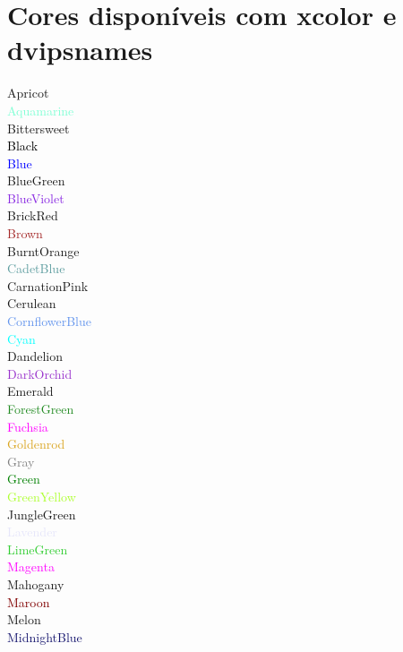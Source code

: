 \documentclass{article}
\begin{document}
\section*{Cores disponíveis com xcolor e dvipsnames}

\textcolor{Apricot}{Apricot}\\
\textcolor{Aquamarine}{Aquamarine}\\
\textcolor{Bittersweet}{Bittersweet}\\
\textcolor{Black}{Black}\\
\textcolor{Blue}{Blue}\\
\textcolor{BlueGreen}{BlueGreen}\\
\textcolor{BlueViolet}{BlueViolet}\\
\textcolor{BrickRed}{BrickRed}\\
\textcolor{Brown}{Brown}\\
\textcolor{BurntOrange}{BurntOrange}\\
\textcolor{CadetBlue}{CadetBlue}\\
\textcolor{CarnationPink}{CarnationPink}\\
\textcolor{Cerulean}{Cerulean}\\
\textcolor{CornflowerBlue}{CornflowerBlue}\\
\textcolor{Cyan}{Cyan}\\
\textcolor{Dandelion}{Dandelion}\\
\textcolor{DarkOrchid}{DarkOrchid}\\
\textcolor{Emerald}{Emerald}\\
\textcolor{ForestGreen}{ForestGreen}\\
\textcolor{Fuchsia}{Fuchsia}\\
\textcolor{Goldenrod}{Goldenrod}\\
\textcolor{Gray}{Gray}\\
\textcolor{Green}{Green}\\
\textcolor{GreenYellow}{GreenYellow}\\
\textcolor{JungleGreen}{JungleGreen}\\
\textcolor{Lavender}{Lavender}\\
\textcolor{LimeGreen}{LimeGreen}\\
\textcolor{Magenta}{Magenta}\\
\textcolor{Mahogany}{Mahogany}\\
\textcolor{Maroon}{Maroon}\\
\textcolor{Melon}{Melon}\\
\textcolor{MidnightBlue}{MidnightBlue}\\
\end{document}
